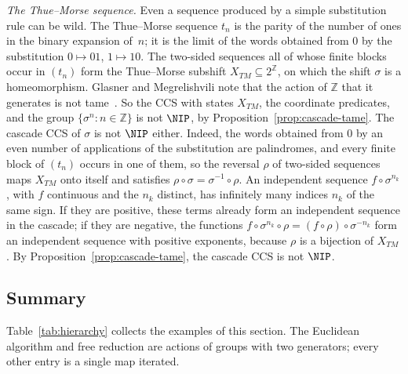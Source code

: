 \emph{The Thue--Morse sequence.}
Even a sequence produced by a simple substitution rule can be wild.
The Thue--Morse sequence $t_n$ is the parity of the number of ones in the binary
expansion of~$n$; it is the limit of the words obtained from $0$ by the
substitution $0\mapsto01$, $1\mapsto10$.
The two-sided sequences all of whose finite blocks occur in $(t_n)$ form the
Thue--Morse subshift $X_{TM}\subseteq2^{\mathbb{Z}}$, on which the shift $\sigma$ is a
homeomorphism.
Glasner and Megrelishvili note that the action of $\mathbb{Z}$ that it
generates is not tame~\cite[Example~5.3]{GlasnerMegrelishvili2023}.
So the CCS with states $X_{TM}$, the coordinate predicates, and the group
$\{\sigma^n:n\in\mathbb{Z}\}$ is not $\NIP$, by Proposition~\ref{prop:cascade-tame}.
The cascade CCS of $\sigma$ is not $\NIP$ either.
Indeed, the words obtained from $0$ by an even number of applications of the
substitution are palindromes, and every finite block of $(t_n)$ occurs in one of
them, so the reversal $\rho$ of two-sided sequences maps $X_{TM}$ onto itself
and satisfies $\rho\circ\sigma=\sigma^{-1}\circ\rho$.
An independent sequence $f\circ\sigma^{n_k}$, with $f$ continuous and the $n_k$
distinct, has infinitely many indices $n_k$ of the same sign.
If they are positive, these terms already form an independent sequence in the
cascade; if they are negative, the functions
$f\circ\sigma^{n_k}\circ\rho=(f\circ\rho)\circ\sigma^{-n_k}$ form an independent
sequence with positive exponents, because $\rho$ is a bijection of $X_{TM}$.
By Proposition~\ref{prop:cascade-tame}, the cascade CCS is not $\NIP$.


\subsection{Summary}
Table~\ref{tab:hierarchy} collects the examples of this section.
The Euclidean algorithm and free reduction are actions of groups with two
generators; every other entry is a single map iterated.

